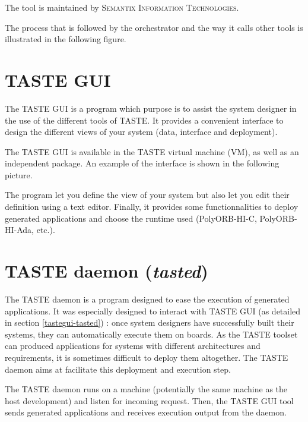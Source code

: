 \documentclass[11pt]{book}
\newcommand{\Concept}[1]{#1\xspace}
\newcommand{\taste}{\Concept{TASTE}}
\begin{document}
   The tool is maintained by \textsc{Semantix Information Technologies}.

   The process that is followed by the orchestrator and the way it calls other
   tools is illustrated in the following figure.

   \centerline{}

   \section{TASTE GUI}
   The \taste GUI is a program which purpose is to assist the system designer in
   the use of the different tools of \taste. It provides a convenient interface
   to design the different views of your system (data, interface and
   deployment).

   The TASTE GUI is available in the \taste virtual machine (VM), as well as an
   independent package. An example of the interface is shown in the following
   picture.

   \centerline{}

   The program let you define the view of your system but also let you edit
   their definition using a text editor. Finally, it provides some
   functionnalities to deploy generated applications and choose the runtime used
   (PolyORB-HI-C, PolyORB-HI-Ada, etc.).

   \section{TASTE daemon (\textit{tasted})}
   The TASTE daemon is a program designed to ease the execution of generated
   applications. It was especially designed to interact with TASTE GUI (as
   detailed in section \ref{tastegui-tasted}) : once
   system designers have successfully built their systems, they can
   automatically execute them on boards.
   As the TASTE toolset can produced applications for systems with
   different architectures and requirements, it is sometimes difficult to deploy
   them altogether. The TASTE daemon aims at facilitate this deployment and
   execution step.

   The TASTE daemon runs on a machine (potentially the same machine as the host
   development) and listen for incoming request. Then, the TASTE GUI tool sends
   generated applications and receives execution output from the daemon.

   \centerline{}
\end{document}

